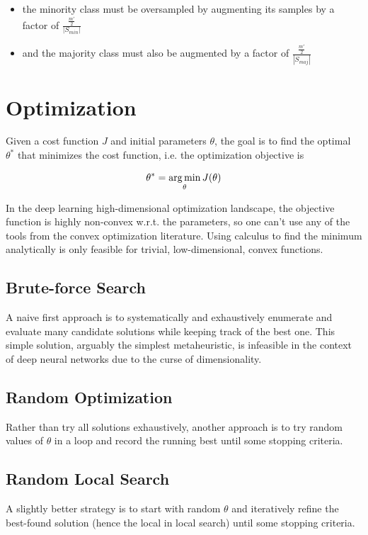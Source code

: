 \begin{itemize}
    \item the minority class must be oversampled by augmenting its samples  by a factor of $\frac{\frac{m'}{2}}{|S_{min}|}$
    \item and the majority class must also be augmented by a factor of $\frac{\frac{m'}{2}}{|S_{maj}|}$
\end{itemize}

\section{Optimization}

Given a cost function $J$ and initial parameters $\theta$, the goal is to find the optimal $\theta^*$ that minimizes the cost function, i.e. the optimization objective is

$$
\theta^{*} = \operatorname*{arg\,min}_{\theta} J(\theta)
$$

In the deep learning high-dimensional optimization landscape, the objective function is highly non-convex w.r.t. the parameters, so one can't use any of the tools from the convex optimization literature. Using calculus to find the minimum analytically is only feasible for trivial, low-dimensional, convex functions.

\subsection{Brute-force Search}

A naive first approach is to systematically and exhaustively enumerate and evaluate many candidate solutions while keeping track of the best one. This simple solution, arguably the simplest metaheuristic, is infeasible in the context of deep neural networks due to the curse of dimensionality.

\subsection{Random Optimization}

Rather than try all solutions exhaustively, another approach is to try random values of $\theta$ in a loop and record the running best until some stopping criteria.

\subsection{Random Local Search}

A slightly better strategy is to start with random $\theta$ and iteratively refine the best-found solution (hence the local in local search) until some stopping criteria.

